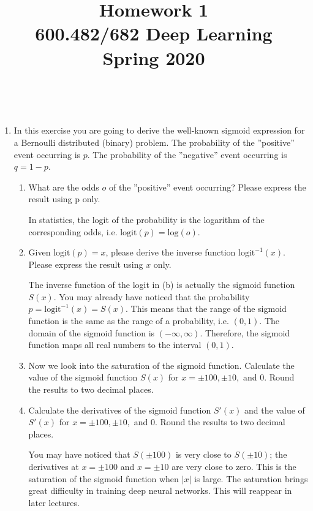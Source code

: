 \documentclass[a4paper]{article}
\title{Homework 1\\
600.482/682 Deep Learning\\
Spring 2020}
\author{\bf{}}
\begin{document}
\maketitle

\\

\vspace{5mm}

\begin{enumerate}
\item	In this exercise you are going to derive the well-known sigmoid expression for a Bernoulli distributed (binary) problem. The probability of the ''positive'' event occurring is $p$. The probability of the ''negative'' event occurring is $q=1-p$.

\begin{enumerate}
	\item What are the odds $o$ of the ''positive'' event occurring? Please express the result using p only.
	
	In statistics, the logit of the probability is the logarithm of the corresponding odds, i.e. $\textrm{logit}(p)=\textrm{log}(o)$.
	
	\item Given $\textrm{logit}(p)=x$, please derive the inverse function $\textrm{logit}^{-1}(x)$. Please express the result using $x$ only.
	
The inverse function of the logit in (b) is actually the sigmoid function $S(x)$. You may already have noticed that the probability $p = \textrm{logit}^{-1}(x) = S(x)$. This means that the range of the sigmoid function is the same as the range of a probability, i.e. $(0, 1)$. The domain of the sigmoid function is $(-\infty, \infty)$. Therefore, the sigmoid function maps all real numbers to the interval $(0, 1)$. 
	
	\item Now we look into the saturation of the sigmoid function. Calculate the value of the sigmoid function $S(x)$ for $x=\pm100, \pm10,$ and $0$. Round the results to two decimal places.
	\item Calculate the derivatives of the sigmoid function $S'(x)$ and the value of $S'(x)$ for $x=\pm100, \pm10,$ and $0$. Round the results to two decimal places. 
	
You may have noticed that $S(\pm100)$ is very close to $S(\pm10)$; the derivatives at $x=\pm100$ and $x=\pm10$ are very close to zero. This is the saturation of the sigmoid function when $|x|$ is large. The saturation brings great difficulty in training deep neural networks. This will reappear in later lectures.


\end{enumerate}
\end{enumerate}
\end{document}

